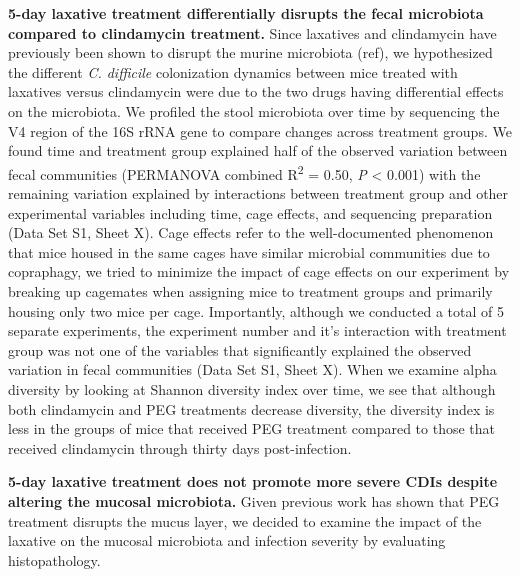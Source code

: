 \documentclass[
  11pt,
]{article}
\begin{document}
\textbf{5-day laxative treatment differentially disrupts the fecal
microbiota compared to clindamycin treatment.} Since laxatives and
clindamycin have previously been shown to disrupt the murine microbiota
(ref), we hypothesized the different \emph{C. difficile} colonization
dynamics between mice treated with laxatives versus clindamycin were due
to the two drugs having differential effects on the microbiota. We
profiled the stool microbiota over time by sequencing the V4 region of
the 16S rRNA gene to compare changes across treatment groups. We found
time and treatment group explained half of the observed variation
between fecal communities (PERMANOVA combined R\textsuperscript{2} =
0.50, \emph{P} \textless{} 0.001) with the remaining variation explained
by interactions between treatment group and other experimental variables
including time, cage effects, and sequencing preparation (Data Set S1,
Sheet X). Cage effects refer to the well-documented phenomenon that mice
housed in the same cages have similar microbial communities due to
copraphagy, we tried to minimize the impact of cage effects on our
experiment by breaking up cagemates when assigning mice to treatment
groups and primarily housing only two mice per cage. Importantly,
although we conducted a total of 5 separate experiments, the experiment
number and it's interaction with treatment group was not one of the
variables that significantly explained the observed variation in fecal
communities (Data Set S1, Sheet X). When we examine alpha diversity by
looking at Shannon diversity index over time, we see that although both
clindamycin and PEG treatments decrease diversity, the diversity index
is less in the groups of mice that received PEG treatment compared to
those that received clindamycin through thirty days post-infection.

\textbf{5-day laxative treatment does not promote more severe CDIs
despite altering the mucosal microbiota.} Given previous work has shown
that PEG treatment disrupts the mucus layer, we decided to examine the
impact of the laxative on the mucosal microbiota and infection severity
by evaluating histopathology.
\end{document}
